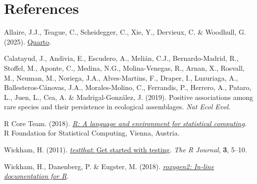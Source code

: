 \documentclass[
  letterpaper,
  DIV=11,
  numbers=noendperiod]{scrartcl}
\newlength{\cslhangindent}
\newenvironment{CSLReferences}[2] %
 {\begin{list}{}{%
  \setlength{\itemindent}{0pt}
  \setlength{\leftmargin}{0pt}
  \setlength{\parsep}{0pt}
  \ifodd #1
   \setlength{\leftmargin}{\cslhangindent}
   \setlength{\itemindent}{-1\cslhangindent}
  \fi
  \setlength{\itemsep}{#2\baselineskip}}}
 {\end{list}}
\begin{document}
\section*{References}\label{references}

\label{refs}
\begin{CSLReferences}{1}{1}
Allaire, J.J., Teague, C., Scheidegger, C., Xie, Y., Dervieux, C. \&
Woodhull, G. (2025).
\href{https://doi.org/10.5281/zenodo.5960048}{{Quarto}}.

Calatayud, J., Andivia, E., Escudero, A., Melián, C.J., Bernardo-Madrid,
R., Stoffel, M., Aponte, C., Medina, N.G., Molina-Venegas, R., Arnan,
X., Rosvall, M., Neuman, M., Noriega, J.A., Alves-Martins, F., Draper,
I., Luzuriaga, A., Ballesteros-Cánovas, J.A., Morales-Molino, C.,
Ferrandis, P., Herrero, A., Pataro, L., Juen, L., Cea, A. \&
Madrigal-González, J. (2019). Positive associations among rare species
and their persistence in ecological assemblages. \emph{Nat Ecol Evol}.

R Core Team. (2018). \emph{\href{https://www.R-project.org/}{R: A
language and environment for statistical computing}}. R Foundation for
Statistical Computing, Vienna, Austria.

Wickham, H. (2011).
\href{https://journal.r-project.org/archive/2011-1/RJournal_2011-1_Wickham.pdf}{{\emph{testthat}}:
Get started with testing}. \emph{The R Journal}, \textbf{3}, 5--10.

Wickham, H., Danenberg, P. \& Eugster, M. (2018).
\emph{\href{https://CRAN.R-project.org/package=roxygen2}{{\emph{roxygen2}}:
In-line documentation for {R}}}.

\end{CSLReferences}
\end{document}

